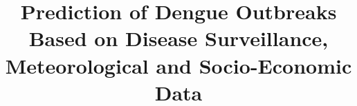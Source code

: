 \documentclass{bmcart}
\begin{document}
\begin{frontmatter}

\begin{fmbox}


\title{Prediction of Dengue Outbreaks Based on Disease Surveillance, Meteorological and Socio-Economic Data}



\author[
   addressref={aff1},                   %
   corref={aff1},                       %
   email={raghavendra.jain@gmail.com}   %
]{ }
\author[
   addressref={aff2},
   email={arttioz@gmail.com}
]{ }
\author[
addressref={aff4},
email={iamsiri@gmail.com}
]{ }
\author[
addressref={aff1},
email={helmut@nii.ac.jp}
]{ }




\address[id=aff1]{%
  , %
  ,                              %
}
\address[id=aff2]{%
  ,
  ,   
}
\address[id=aff4]{%
	,
	,   
}




\end{fmbox}
\end{frontmatter}
\end{document}
